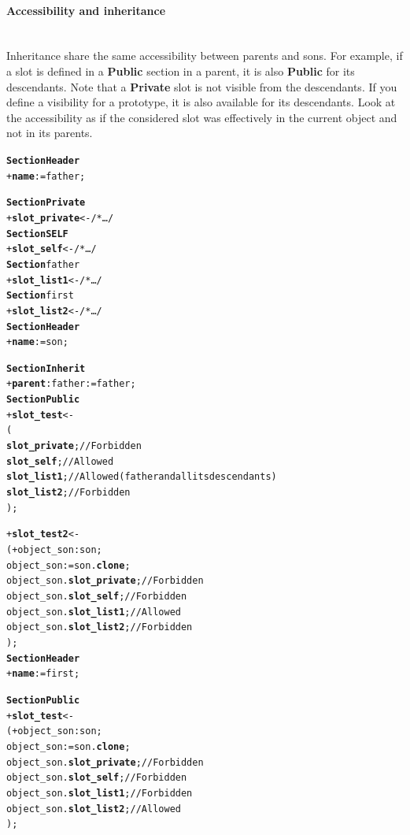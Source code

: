\documentclass[11pt]{mybook}
\begin{document}
\paragraph{Accessibility and inheritance} 
~\\
Inheritance share the same accessibility between parents and sons.
For example, if a slot is defined in a {\bf{}Public} section in a parent, it is also {\bf{}Public} for its descendants.
Note that a {\bf{}Private} slot is not visible from the descendants.
If you define a visibility for a prototype, it is also available for its descendants.
Look at the accessibility as if the considered slot was effectively in the current object and not in its parents.
\begin{alltt} 
{\bf{}Section Header}
  + {\bf{}name} := {\sc{}father};

{\bf{}Section Private}
  + {\bf{}slot\_private} <- /* \ldots */
{\bf{}Section SELF}
  + {\bf{}slot\_self} <- /* \ldots */
{\bf{}Section} {\sc{}father}
  + {\bf{}slot\_list1} <- /* \ldots */
{\bf{}Section} {\sc{}first}
  + {\bf{}slot\_list2} <- /* \ldots */\\

{\bf{}Section Header}
  + {\bf{}name} := {\sc{}son};

{\bf{}Section Inherit}
  + {\bf{}parent}:{\sc{}father} := {\sc{}father};
{\bf{}Section Public}
  + {\bf{}slot\_test} <-
  ( 
    {\bf{}slot\_private};                      // Forbidden
    {\bf{}slot\_self};                         // Allowed
    {\bf{}slot\_list1};                        // Allowed ({\sc{}father} and all its descendants)
    {\bf{}slot\_list2};                        // Forbidden
  );

  + {\bf{}slot\_test2} <-
  ( + object\_son:{\sc{}son};
    object\_son := {\sc{}son}.{\bf{}clone};
    object\_son.{\bf{}slot\_private};          // Forbidden
    object\_son.{\bf{}slot\_self};             // Forbidden
    object\_son.{\bf{}slot\_list1};            // Allowed
    object\_son.{\bf{}slot\_list2};            // Forbidden
  );\\

{\bf{}Section Header}
  + {\bf{}name} := {\sc{}first};

{\bf{}Section Public}
  + {\bf{}slot\_test} <-
  ( + object\_son:{\sc{}son};
    object\_son := {\sc{}son}.{\bf{}clone};
    object\_son.{\bf{}slot\_private};          // Forbidden
    object\_son.{\bf{}slot\_self};             // Forbidden
    object\_son.{\bf{}slot\_list1};            // Forbidden
    object\_son.{\bf{}slot\_list2};            // Allowed
  );
\end{alltt}
\end{document}

